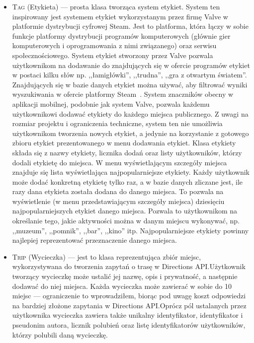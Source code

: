 \begin{itemize}
		\item \textsc{Tag} (Etykieta) — prosta klasa tworząca system etykiet. System ten inspirowany jest systemem etykiet wykorzystanym przez firmę Valve w platformie dystrybucji cyfrowej Steam.
		Jest to platforma, która łączy w sobie funkcje platformy dystrybucji programów komputerowych (głównie gier komputerowych i oprogramowania z nimi związanego) oraz serwisu społecznościowego.
		System etykiet stworzony przez Valve pozwala użytkownikom na dodawanie do znajdujących się w ofercie programów etykiet w postaci kilku słów np. ,,łamigłówki'', ,,trudna'', ,,gra z otwartym światem''.
		Znajdujących się w bazie danych etykiet można używać, aby filtrować wyniki wyszukiwania w ofercie platformy Steam~\cite{STEAM}. System znaczników obecny w aplikacji mobilnej, podobnie jak system
		Valve, pozwala każdemu użytkownikowi dodawać etykiety do każdego miejsca publicznego. Z uwagi na rozmiar projektu i ograniczenia techniczne, system ten nie umożliwia użytkownikom tworzenia nowych
		etykiet, a jedynie na korzystanie z gotowego zbioru etykiet prezentowanego w menu dodawania etykiet. Klasa etykiety składa się z nazwy etykiety, licznika dodań oraz listy użytkowników, którzy
		dodali etykietę do miejsca. W menu wyświetlającym szczegóły miejsca znajduje się lista wyświetlająca najpopularniejsze etykiety. Każdy użytkownik może dodać konkretną etykietę tylko raz, a 
		w bazie danych zliczane jest, ile razy dana etykieta została dodana do danego miejsca. To pozwala na wyświetlenie (w menu przedstawiającym szczegóły miejsca) dziesięciu najpopularniejszych etykiet
		danego miejsca. Pozwala to użytkownikom na określanie tego, jakie aktywności można w danym miejscu wykonywać, np. ,,muzeum'', ,,pomnik'', ,,bar'', ,,kino'' itp. Najpopularniejsze etykiety powinny najlepiej
		reprezentować przeznaczenie danego miejsca.
\newpage
		\item \textsc{Trip} (Wycieczka) — jest to klasa reprezentująca zbiór miejsc, wykorzystywana do tworzenia zapytań o trasę w Directions API.\@ Użytkownik tworzący wycieczkę
		może ustalić jej nazwę, opis i prywatność, a następnie dodawać do niej miejsca. Każda wycieczka może zawierać w sobie do 10 miejsc — ograniczenie to wprowadziłem, biorąc pod uwagę koszt odpowiedzi na bardziej złożone zapytania
		w Directions API.\@ Oprócz pól ustalanych przez użytkownika wycieczka zawiera także unikalny identyfikator, identyfikator i pseudonim autora, licznik polubień  oraz listę identyfikatorów 
		użytkowników, którzy polubili daną wycieczkę. 
     \end{itemize}
		
